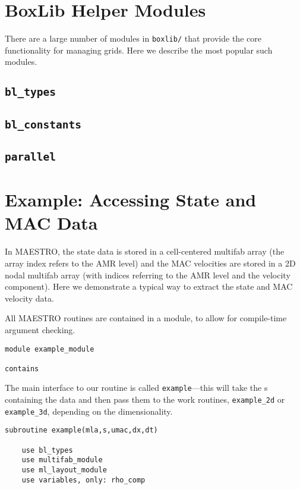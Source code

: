 \section{BoxLib Helper Modules}

There are a large number of modules in {\tt boxlib/} that provide
the core functionality for managing grids.  Here we describe
the most popular such modules.


\subsection{{\tt bl\_types}}

\subsection{{\tt bl\_constants}}

\subsection{{\tt parallel}}

\section{\label{sec:example} Example: Accessing State and MAC Data}

In MAESTRO, the state data is stored in a cell-centered multifab array
(the array index refers to the AMR level) and the MAC velocities are
stored in a 2D nodal multifab array (with indices referring to the AMR
level and the velocity component).  Here we demonstrate a typical way
to extract the state and MAC velocity data.

All MAESTRO routines are contained in a module, to allow for compile-time
argument checking.
\begin{lstlisting}[language={[95]fortran},mathescape=false]
module example_module

contains
\end{lstlisting}

The main interface to our routine is called {\tt example}---this will
take the \multifab s containing the data and then pass them to the
work routines, {\tt example\_2d} or {\tt example\_3d}, depending on
the dimensionality.  
\begin{lstlisting}[language={[95]fortran},mathescape=false]
  subroutine example(mla,s,umac,dx,dt)

    use bl_types
    use multifab_module
    use ml_layout_module
    use variables, only: rho_comp
\end{lstlisting}

